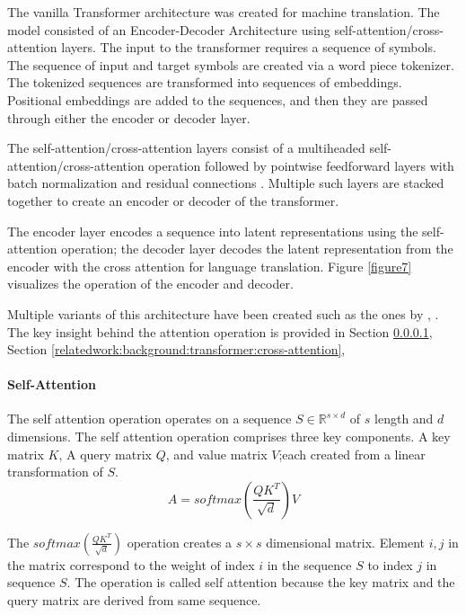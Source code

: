 The vanilla Transformer architecture \parencite{vaswani2017attention} was created for machine translation. The model consisted of an Encoder-Decoder Architecture using self-attention/cross-attention layers. The input to the transformer requires a sequence of symbols. The sequence of input and target symbols are created via a word piece tokenizer. The tokenized sequences are transformed into sequences of embeddings. Positional embeddings are added to the sequences, and then they are passed through either the encoder or decoder layer.

The self-attention/cross-attention layers consist of a multiheaded self-attention/cross-attention operation followed by pointwise feedforward layers with batch normalization \parencite{ioffe2015batch} and residual connections \parencite{he2016deep}. Multiple such layers are stacked together to create an encoder or decoder of the transformer. 

The encoder layer encodes a sequence into latent representations using the self-attention operation; the decoder layer decodes the latent representation from the encoder with the cross attention for language translation. Figure \ref{figure7} visualizes the operation of the encoder and decoder. 

Multiple variants of this architecture have been created such as the ones by \cite{radford2019language}, \cite{devlin2018bert}. The key insight behind the attention operation is provided in Section \ref{relatedwork:background:transformer:attention}, Section \ref{relatedwork:background:transformer:cross-attention}, 

\paragraph{Self-Attention}
\label{relatedwork:background:transformer:attention}
The self attention operation operates on a sequence $S \in \mathbb{R}^{s \times d}$ of $s$ length and $d$ dimensions. The self attention operation comprises three key components. A key matrix $K$, A query matrix $Q$, and value matrix $V$;each created from a linear transformation of $S$. 
$$A = softmax(\frac{QK^T}{\sqrt{d}})V$$

The $softmax(\frac{QK^T}{\sqrt{d}})$ operation creates a $s \times s$ dimensional matrix. Element ${i,j}$ in the matrix correspond to the weight of index $i$ in the sequence $S$ to index $j$ in sequence $S$. The operation is called self attention because the key matrix and the query matrix are derived from same sequence.

